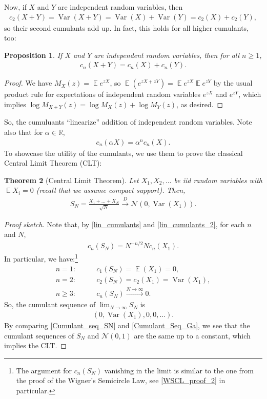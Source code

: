 \documentclass[letterpaper,11pt,oneside,reqno]{amsart}
\numberwithin{equation}{section}
\DeclareMathOperator{\EE}{\mathbb{E}}
\DeclareMathOperator{\VAR}{\mathrm{Var}}
\newtheorem{proposition}{Proposition}[section]
\newtheorem{theorem}[proposition]{Theorem}
\theoremstyle{definition}
\begin{document}
Now, if $X$ and $Y$ are independent random variables, then 
\begin{align*}
	c_2(X+Y)=\VAR(X+Y)=\VAR(X)+\VAR(Y)=c_2(X)+c_2(Y),
\end{align*}
so their second cumulants add up.
In fact, this holds for all higher cumulants, too:
\begin{proposition}
If $X$ and $Y$ are independent random variables, then for all $n\geq 1$, 
\begin{align}\label{lin_cumulants}
c_n(X+Y)=c_n(X)+c_n(Y).
\end{align}
\end{proposition}
\begin{proof}
	We have
	$M_X(z)=\EE e^{zX}$, so 
	$\EE(e^{zX+zY})=\EE e^{zX}\EE e^{zY}$
	by the usual product rule for expectations of independent
	random variables $e^{zX}$ and  $e^{zY}$, which implies
	$\log M_{X+Y}(z)=\log M_X(z)+\log M_Y(z)$, as desired.
\end{proof}

So, the cumuluants ``linearize'' addition of independent random variables. 
Note also that for $\alpha\in \mathbb{R}$, 
\begin{align}\label{lin_cumulants_2}
	c_n(\alpha X)=\alpha^nc_n(X).
\end{align}
To showcase the utility of the cumulants, we use them to prove the classical Central Limit Theorem (CLT):
\begin{theorem}[Central Limit Theorem]\label{thm:classic_clt}
	Let $X_1, X_2, ...$ be iid random variables with $\EE X_i=0$ (recall that we assume compact support). Then, 
	\begin{align*}
		S_N=\frac{X_1+...+X_N}{\sqrt{N}}\xrightarrow{\ D\ } \mathcal{N}(0,\VAR(X_1)).
	\end{align*}
\end{theorem}
\begin{proof}[Proof sketch]
	Note that, by \eqref{lin_cumulants} and \eqref{lin_cumulants_2}, for each $n$ and $N$, 
	\begin{align*}
	c_n(S_N)=N^{-n/2}Nc_n(X_1).
	\end{align*}
	In particular, we have:\footnote{The argument for $c_n(S_N)$ vanishing in the limit is similar to the one from 
	the proof of the Wigner's Semicircle Law, see 
	\eqref{WSCL_proof_2} in particular.} 
	\begin{align*}
	    n=1 :&\qquad  c_1(S_N) = \EE(X_1)=0,\\
	    n=2 :&\qquad  c_2(S_N) =c_2(X_1)=\VAR(X_1),\\
	     n\geq 3  :&\qquad c_n(S_N)\xrightarrow{N\to\infty} 0.
	\end{align*}
	So, the cumulant sequence of $\displaystyle \lim_{N\to\infty} S_N$ is 
	\begin{align}\label{Cumulant_seq_SN}
		(0, \VAR(X_1), 0, 0, ...).
	\end{align}
	By comparing \eqref{Cumulant_seq_SN} and \eqref{Cumulant_Seq_Ga}, we see that the cumulant sequences of $S_N$ and $\mathcal{N}(0,1)$ are the same up to a constant, which implies the CLT.
\end{proof}
\end{document}
